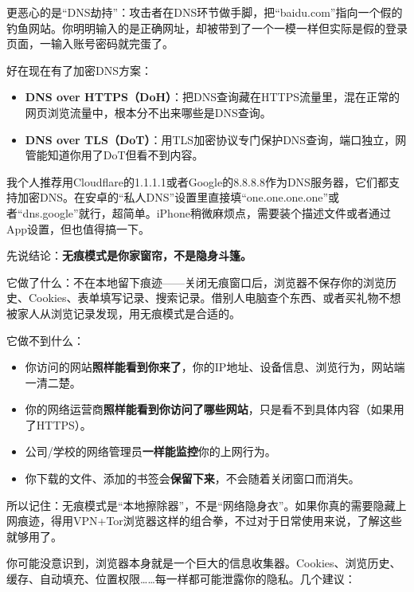 更恶心的是“DNS劫持”：攻击者在DNS环节做手脚，把“baidu.com”指向一个假的钓鱼网站。你明明输入的是正确网址，却被带到了一个一模一样但实际是假的登录页面，一输入账号密码就完蛋了。

好在现在有了加密DNS方案：

\begin{itemize}
  \item \textbf{DNS over HTTPS（DoH）}：把DNS查询藏在HTTPS流量里，混在正常的网页浏览流量中，根本分不出来哪些是DNS查询。
  \item \textbf{DNS over TLS（DoT）}：用TLS加密协议专门保护DNS查询，端口独立，网管能知道你用了DoT但看不到内容。
\end{itemize}

我个人推荐用Cloudflare的1.1.1.1或者Google的8.8.8.8作为DNS服务器，它们都支持加密DNS。在安卓的“私人DNS”设置里直接填“one.one.one.one”或者“dns.google”就行，超简单。iPhone稍微麻烦点，需要装个描述文件或者通过App设置，但也值得搞一下。


先说结论：\textbf{无痕模式是你家窗帘，不是隐身斗篷。}

它做了什么：不在本地留下痕迹——关闭无痕窗口后，浏览器不保存你的浏览历史、Cookies、表单填写记录、搜索记录。借别人电脑查个东西、或者买礼物不想被家人从浏览记录发现，用无痕模式是合适的。

它做不到什么：

\begin{itemize}
  \item 你访问的网站\textbf{照样能看到你来了}，你的IP地址、设备信息、浏览行为，网站端一清二楚。
  \item 你的网络运营商\textbf{照样能看到你访问了哪些网站}，只是看不到具体内容（如果用了HTTPS）。
  \item 公司/学校的网络管理员\textbf{一样能监控}你的上网行为。
  \item 你下载的文件、添加的书签会\textbf{保留下来}，不会随着关闭窗口而消失。
\end{itemize}

所以记住：无痕模式是“本地擦除器”，不是“网络隐身衣”。如果你真的需要隐藏上网痕迹，得用VPN+Tor浏览器这样的组合拳，不过对于日常使用来说，了解这些就够用了。


你可能没意识到，浏览器本身就是一个巨大的信息收集器。Cookies、浏览历史、缓存、自动填充、位置权限……每一样都可能泄露你的隐私。几个建议：

